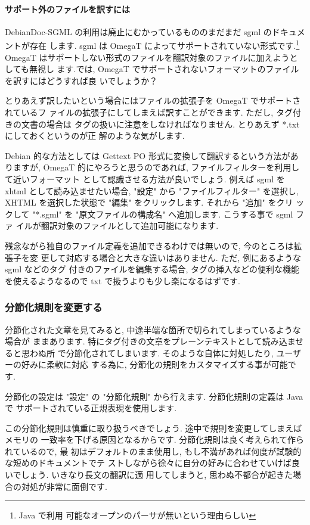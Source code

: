\documentclass[mingoth,a4paper]{jsarticle}
\begin{document}
\paragraph{サポート外のファイルを訳すには}
DebianDoc-SGML の利用は廃止にむかっているもののまだまだ sgml のドキュメントが存在
します. sgml は OmegaT によってサポートされていない形式です.\footnote{Java で利用
可能なオープンのパーサが無いという理由らしい}
OmegaT はサポートしない形式のファイルを翻訳対象のファイルに加えようとしても無視し
ます.では, OmegaT でサポートされないフォーマットのファイルを訳すにはどうすれば良
いでしょうか？

とりあえず訳したいという場合にはファイルの拡張子を OmegaT でサポートされているフ
ァイルの拡張子にしてしまえば訳すことができます. ただし, タグ付きの文書の場合は
タグの扱いに注意をしなければなりません. とりあえず *.txt にしておくというのが正
解のような気がします.

Debian 的な方法としては Gettext PO 形式に変換して翻訳するという方法がありますが,
 OmegaT 的にやろうと思うのであれば, ファイルフィルターを利用して近いフォーマット
として認識させる方法が良いでしょう.
例えば sgml を xhtml として読み込ませたい場合, "設定" から "ファイルフィルター"
を選択し, XHTML を選択した状態で "編集" をクリックします. それから "追加" をクリ
ックして "*.sgml" を "原文ファイルの構成名" へ追加します. こうする事で sgml ファ
イルが翻訳対象のファイルとして追加可能になります.

残念ながら独自のファイル定義を追加できるわけでは無いので, 今のところは拡張子を変
更して対応する場合と大きな違いはありません. ただ, 例にあるような sgml などのタグ
付きのファイルを編集する場合, タグの挿入などの便利な機能を使えるようなるので txt
 で扱うよりも少し楽になるはずです.

\subsubsection{分節化規則を変更する}
分節化された文章を見てみると, 中途半端な箇所で切られてしまっているような場合が
ままあります. 特にタグ付きの文章をプレーンテキストとして読み込ませると思わぬ所
で分節化されてしまいます. そのような自体に対処したり, ユーザーの好みに柔軟に対応
する為に, 分節化の規則をカスタマイズする事が可能です.

分節化の設定は "設定" の "分節化規則" から行えます. 分節化規則の定義は Java で
サポートされている正規表現を使用します.

この分節化規則は慎重に取り扱うべきでしょう. 途中で規則を変更してしまえばメモリの
一致率を下げる原因となるからです. 分節化規則は良く考えられて作られているので, 最
初はデフォルトのまま使用し, もし不満があれば何度が試験的な短めのドキュメントでテ
ストしながら徐々に自分の好みに合わせていけば良いでしょう. いきなり長文の翻訳に適
用してしまうと, 思わぬ不都合が起きた場合の対処が非常に面倒です.
\end{document}
